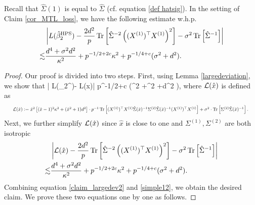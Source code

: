 \begin{claim}\label{claim_reduction}
Recall that $\hat \Sigma(1)$ is equal to $\hat \Sigma$ (cf. equation \eqref{def hatsig}).
In the setting of Claim \ref{cor_MTL_loss}, we have the following estimate w.h.p.
\begin{align*}
&\left|L(\hat{\beta}_2^{\MTL}) - \frac{2d^2}{p}\tr\left[\hat\Sigma^{-2} \left((X^{(1)})^\top X^{(1)} \right)^2\right] -\sigma^2  \bigtr{{\hat \Sigma^{-1}  }}\right| \nonumber\\
\lesssim&  \frac{d^4 + \sigma^2 d^2}{\kappa^2}+p^{-1/2+2c}\kappa^2 +  p^{-1/4+c} (\sigma^2 +d^2).
\end{align*}
\end{claim}
\begin{proof}
Our proof is divided into two steps. First, using Lemma \ref{largedeviation}, we show that
\be\label{claim_largedev2} \left| L(\hat{\beta}_2^{\MTL})- \cal L(\hat x)\right| \le p^{-1/2+c} \left(\sigma^2 +\kappa^2 +d^2 \right),
\ee
where $\cal L(\hat x)$ is defined as
\begin{align*}
	\resizebox{0.97\hsize}{!}{%
	$\cal L(\hat x)	:=  \hat x^2\left[(\hat x-1)^2 \kappa^2 +  (\hat x^2+1)d^2 \right] \cdot p^{-1}\bigtr{ (X^{(1)})^{\top}X^{(1)} \hat\Sigma(\hat x)^{-1} \Sigma^{(2)} \hat\Sigma(\hat x)^{-1} (X^{(1)})^{\top}X^{(1)} }
	 +\sigma^2\cdot \bigtr{\Sigma^{(2)}\hat \Sigma(\hat x)^{-1}}.$
	}%
\end{align*}
Next, we further simplify $\cal L(\hat x)$ since $\hat{x}$ is close to one and $\Sigma^{(1)},\Sigma^{(2)}$ are both isotropic
\begin{align}
	&\left|\cal L(\hat x)- \frac{2d^2}{p} \tr\left[\hat\Sigma^{-2} \left((X^{(1)})^\top X^{(1)} \right)^2\right] -\sigma^2  \bigtr{\hat \Sigma^{-1}}\right| \nonumber\\
\lesssim & \frac{d^4 + \sigma^2 d^2}{\kappa^2}+p^{-1/2+2c}\kappa^2 +  p^{-1/4+c} (\sigma^2 +d^2). \label{simple12}
\end{align}
Combining equation \eqref{claim_largedev2} and \eqref{simple12}, we obtain the desired claim.
We prove these two equations one by one as follows.


\end{proof}
